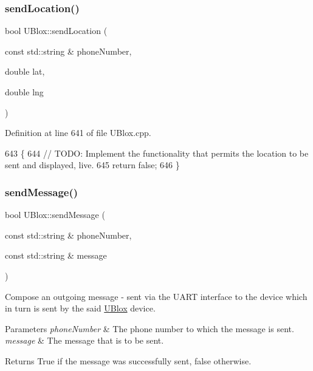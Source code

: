 \subsubsection{\texorpdfstring{send\+Location()}{sendLocation()}}
{\footnotesize\ttfamily bool U\+Blox\+::send\+Location (\begin{DoxyParamCaption}\item[{const std\+::string \&}]{phone\+Number,  }\item[{double}]{lat,  }\item[{double}]{lng }\end{DoxyParamCaption})}



Definition at line 641 of file U\+Blox.\+cpp.


\begin{DoxyCode}
643 \{
644     \textcolor{comment}{// TODO: Implement the functionality that permits the location to be sent and displayed, live.}
645     \textcolor{keywordflow}{return} \textcolor{keyword}{false};
646 \}
\end{DoxyCode}
\mbox{\label{class_u_blox_a946f2903bb01a62cd5bdef423eaa9750}} 
\subsubsection{\texorpdfstring{send\+Message()}{sendMessage()}}
{\footnotesize\ttfamily bool U\+Blox\+::send\+Message (\begin{DoxyParamCaption}\item[{const std\+::string \&}]{phone\+Number,  }\item[{const std\+::string \&}]{message }\end{DoxyParamCaption})}

Compose an outgoing message -\/ sent via the U\+A\+RT interface to the device which in turn is sent by the said \hyperlink{class_u_blox}{U\+Blox} device.


\begin{DoxyParams}{Parameters}
{\em phone\+Number} & The phone number to which the message is sent. \\
\hline
{\em message} & The message that is to be sent. \\
\hline
\end{DoxyParams}
\begin{DoxyReturn}{Returns}
True if the message was successfully sent, false otherwise. 
\end{DoxyReturn}


